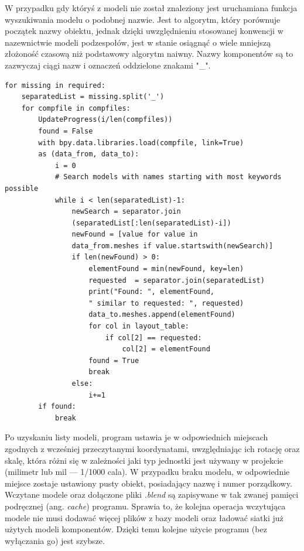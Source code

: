 \documentclass[brudnopis]{xmgr}
\begin{document}
W przypadku gdy któryś z modeli nie został znaleziony jest uruchamiana funkcja wyszukiwania modelu o podobnej nazwie. Jest to algorytm, który porównuje początek nazwy obiektu, jednak dzięki uwzględnieniu stosowanej konwencji w nazewnictwie modeli podzespołów, jest w stanie osiągnąć o wiele mniejszą złożoność czasową niż podstawowy algorytm naiwny. Nazwy komponentów są to zazwyczaj ciągi nazw i oznaczeń oddzielone znakami "\_".
\begin{lstlisting}
for missing in required:
    separatedList = missing.split('_')
    for compfile in compfiles:
        UpdateProgress(i/len(compfiles))
        found = False
        with bpy.data.libraries.load(compfile, link=True)
        as (data_from, data_to):
            i = 0
            # Search models with names starting with most keywords possible
            while i < len(separatedList)-1:
                newSearch = separator.join
                (separatedList[:len(separatedList)-i])
                newFound = [value for value in
                data_from.meshes if value.startswith(newSearch)]
                if len(newFound) > 0:
                    elementFound = min(newFound, key=len)
                    requested  = separator.join(separatedList)
                    print("Found: ", elementFound,
                    " similar to requested: ", requested)
                    data_to.meshes.append(elementFound)
                    for col in layout_table:
                        if col[2] == requested:
                            col[2] = elementFound
                    found = True
                    break
                else:
                    i+=1
        if found:
            break
\end{lstlisting}
Po uzyskaniu listy modeli, program ustawia je w odpowiednich miejscach zgodnych z wcześniej przeczytanymi koordynatami, uwzględniając ich rotację oraz skalę, która różni się w zależności jaki typ jednostki jest używany w projekcie (milimetr lub mil --- 1/1000 cala). W przypadku braku modelu, w odpowiednie miejsce zostaje ustawiony pusty obiekt, posiadający nazwę i numer porządkowy.
Wczytane modele oraz dołączone pliki \emph{.blend} są zapisywane w tak zwanej pamięci podręcznej (ang. \emph{cache}) programu. Sprawia to, że kolejna operacja wczytująca modele nie musi dodawać więcej plików z bazy modeli oraz ładować siatki już użytych modeli komponentów. Dzięki temu kolejne użycie programu (bez wyłączania go) jest szybsze.
\end{document}
